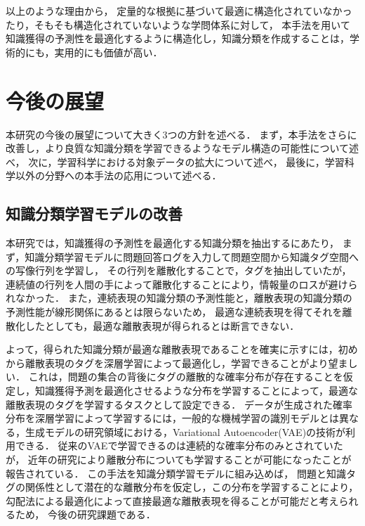 以上のような理由から，
定量的な根拠に基づいて最適に構造化されていなかったり，そもそも構造化されていないような学問体系に対して，
本手法を用いて知識獲得の予測性を最適化するように構造化し，知識分類を作成することは，学術的にも，実用的にも価値が高い．


\section{今後の展望}
本研究の今後の展望について大きく3つの方針を述べる．
まず，本手法をさらに改善し，より良質な知識分類を学習できるようなモデル構造の可能性について述べ，
次に，学習科学における対象データの拡大について述べ，
最後に，学習科学以外の分野への本手法の応用について述べる．


\subsection{知識分類学習モデルの改善}
本研究では，知識獲得の予測性を最適化する知識分類を抽出するにあたり，
まず，知識分類学習モデルに問題回答ログを入力して問題空間から知識タグ空間への写像行列を学習し，
その行列を離散化することで，タグを抽出していたが，
連続値の行列を人間の手によって離散化することにより，情報量のロスが避けられなかった．
また，連続表現の知識分類の予測性能と，離散表現の知識分類の予測性能が線形関係にあるとは限らないため，
最適な連続表現を得てそれを離散化したとしても，最適な離散表現が得られるとは断言できない．

よって，得られた知識分類が最適な離散表現であることを確実に示すには，初めから離散表現のタグを深層学習によって最適化し，学習できることがより望ましい．
これは，問題の集合の背後にタグの離散的な確率分布が存在することを仮定し，知識獲得予測を最適化させるような分布を学習することによって，最適な離散表現のタグを学習するタスクとして設定できる．
データが生成された確率分布を深層学習によって学習するには，一般的な機械学習の識別モデルとは異なる，生成モデルの研究領域における，Variational Autoencoder(VAE)の技術が利用できる\cite{kingma2014semi}．
従来のVAEで学習できるのは連続的な確率分布のみとされていたが，
近年の研究により離散分布についても学習することが可能になったことが報告されている\cite{maddison2016concrete, jang2016categorical}．
この手法を知識分類学習モデルに組み込めば，
問題と知識タグの関係性として潜在的な離散分布を仮定し，この分布を学習することにより，
勾配法による最適化によって直接最適な離散表現を得ることが可能だと考えられるため，
今後の研究課題である．





